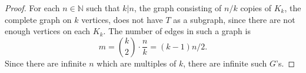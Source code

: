 \documentclass{article}
\begin{document}
\begin{enumerate}
\begin{enumerate}
        \begin{proof}
          For each $n\in\mathbb{N}$ such that $k|n$, the graph consisting
          of $n/k$ copies of $K_k$, the complete graph on $k$ vertices,
          does not have $T$ as a subgraph, since there are not enough
          vertices on each $K_k$. The number of edges in such a graph is
          \[m =\binom{k}{2}\cdot\frac{n}{k} =(k-1)n/2.\]
          Since there are infinite $n$ which are multiples of $k$, there
          are infinite such $G$'s.
        \end{proof}
    \end{enumerate}
\end{enumerate}
\end{document}

